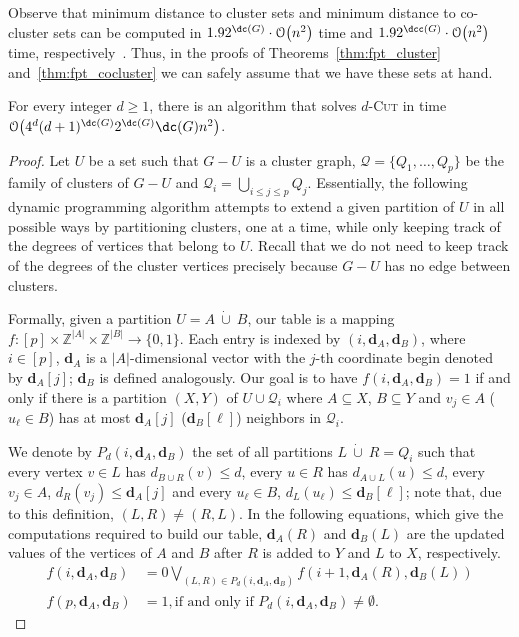 \documentclass[a4paper,UKenglish,cleveref, autoref]{lipics-v2019}
\newcommand{\bmd}{\boldsymbol{d}}
\newcommand{\bigO}[1]{\mathcal{O}\!\left(#1\right)}
\newcommand{\dcup}{\ \dot\cup\ }
\newcommand{\pname}[1]{\textsc{#1}}
\begin{document}
Observe that minimum distance to cluster
sets and minimum distance to co-cluster sets can be computed in $1.92^{\dc( G )} \cdot \bigO{ n^2 }$
time and $1.92^{\dcc( G )} \cdot \bigO{n^2 }$ time, respectively~\cite{branching-cluster}. Thus, in the proofs of Theorems~\ref{thm:fpt_cluster} and~\ref{thm:fpt_cocluster} we can safely assume that we have these sets at hand.


\begin{theorem}
    \label{thm:fpt_cluster}
    For every integer $d \geq 1$, there is an algorithm that solves \pname{$d$-Cut} in time $\bigO{4^d(d+1)^{\dc(G)}2^{\dc(G)}\dc(G)n^2}$.
\end{theorem}

\begin{proof}
    Let $U$ be a set such that $G - U$ is a cluster graph, $\mathcal{Q} = \{Q_1, \dots, Q_p\}$ be the family of clusters of $G - U$ and $\mathcal{Q}_i = \bigcup_{i \leq j \leq p} Q_j$.
    Essentially, the following dynamic programming algorithm attempts to extend a given partition of $U$ in all possible ways by partitioning clusters, one at a time, while only keeping track of the degrees of vertices that belong to $U$.
    Recall that we do not need to keep track of the degrees of the cluster vertices precisely because $G - U$ has no edge between clusters.

    Formally, given a partition $U = A  \dcup B$, our table is a mapping $f : [p] \times \mathbb{Z}^{|A|} \times \mathbb{Z}^{|B|} \rightarrow \{0, 1\}$.
    Each entry is indexed by $(i, \bmd_A, \bmd_B)$, where $i \in [p]$, $\bmd_A$ is a $|A|$-dimensional vector with the $j$-th coordinate begin denoted by $\bmd_A[j]$; $\bmd_B$ is defined analogously.
    Our goal is to have $f(i, \bmd_A, \bmd_B) = 1$ if and only if there is a partition $(X, Y)$ of $U \cup \mathcal{Q}_i$ where $A \subseteq X$, $B \subseteq Y$ and $v_j \in A$ ($u_{\ell} \in B$) has at most $\bmd_A[j]$ ($\bmd_B[\ell]$) neighbors in $\mathcal{Q}_i$.

    We denote by $P_d(i, \bmd_A, \bmd_B)$ the set of all partitions $L  \dcup R = Q_i$ such that every vertex $v \in L$ has $d_{B \cup R}(v) \leq d$, every $u \in R$ has $d_{A \cup L}(u) \leq d$, every $v_j \in A$, $d_R(v_j) \leq \bmd_A[j]$ and every $u_{\ell} \in B$, $d_L(u_{\ell}) \leq \bmd_B[\ell]$; note that, due to this definition, $(L, R) \neq (R, L)$.
    In the following equations, which give the computations required to build our table, $\bmd_A(R)$ and $\bmd_B(L)$ are the updated values of the vertices of $A$ and $B$ after $R$ is added to $Y$ and $L$ to $X$, respectively.
    \begin{align}
        f(i, \bmd_A, \bmd_B) &= 0 \bigvee_{(L, R) \in P_d(i, \bmd_A, \bmd_B)} f(i+1,\bmd_A(R), \bmd_B(L))\label{eq:trans_dc}\\
        f(p, \bmd_A, \bmd_B) &= 1, \text{if and only if $P_d(i, \bmd_A, \bmd_B) \neq \emptyset$.}\label{eq:stop_dc}
    \end{align}


\end{proof}
\end{document}

